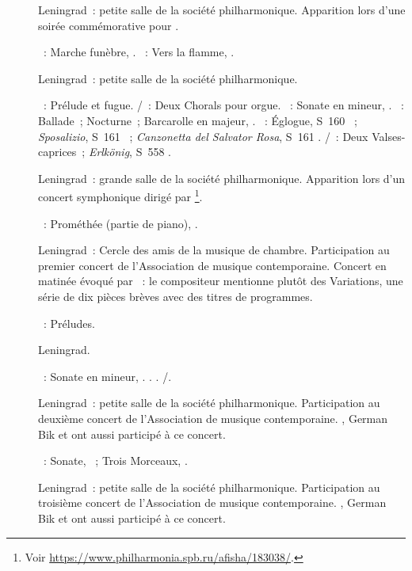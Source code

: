 \begin{description}
 \item[]
 Leningrad~: petite salle de la société philharmonique.
 Apparition lors d'une soirée commémorative pour \VKaratigine{}.

 \textsc{\Medtner{}}~: Marche funèbre,  .
 \textsc{\Scriabine{}}~: Vers la flamme, .
 \item[]
 Leningrad~: petite salle de la société philharmonique.

 \textsc{\JBach{}}~: Prélude et fugue.
 \textsc{\JBach{}/\Busoni{}}~: Deux Chorals pour orgue.
 \textsc{\Beethoven{}}~: Sonate en \kC mineur, .
 \textsc{\Chopin{}}~: Ballade~; Nocturne~; Barcarolle en \kF \Sharp majeur,
 .
 \textsc{\Liszt{}}~: Églogue, S~160 ~; \emph{Sposalizio}, S~161
 ~; \emph{Canzonetta del Salvator Rosa}, S~161 .
 \textsc{\Schubert{}/\Liszt{}}~: Deux Valses-caprices~; \emph{Erlkönig},
 S~558 .
 \item[]
 Leningrad~: grande salle de la société philharmonique.
 Apparition lors d'un concert symphonique dirigé par \NMalko{}%
 \footnote{Voir \href{https://www.philharmonia.spb.ru/afisha/183038/}%
 {https://www.philharmonia.spb.ru/afisha/183038/}.}.

 \textsc{\Scriabine{}}~: Prométhée (partie de piano), .
 \item[]
 Leningrad~: Cercle des amis de la musique de chambre.
 Participation au premier concert de l'\hbox{Association} de musique
 contemporaine.
 Concert en matinée évoqué par \citet{Bogdanov67a}~: le compositeur
 mentionne plutôt des Variations, une série de dix pièces brèves avec des
 titres de programmes.

 \textsc{\BogdanovBerezovsky{}}~: Préludes.
 \item[]
 Leningrad.

 \textsc{\Beethoven{}}~: Sonate en \kC mineur, .
 \textsc{\Chopin{}}.
 \textsc{\Liszt{}}.
 \textsc{\Schubert{}/\Liszt{}}.
 \item[]
 Leningrad~: petite salle de la société philharmonique.
 Participation au deuxième concert de l'\hbox{Association} de musique
 contemporaine.
 \MYudina{}, German Bik et \AKamensky{} ont aussi participé à ce concert.

 \textsc{\Scriabine{}}~: Sonate, ~; Trois Morceaux, .
 \item[]
 Leningrad~: petite salle de la société philharmonique.
 Participation au troisième concert de l'\hbox{Association} de musique
 contemporaine.
 \MYudina{}, German Bik et \AKamensky{} ont aussi participé à ce concert.


\end{description}
